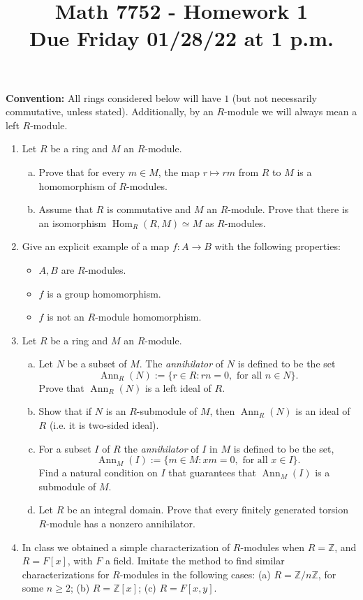 \documentclass[12pt,
psamsfonts]{amsart}
\title{Math 7752 - Homework 1\\
Due Friday 01/28/22 at 1 p.m.}
\theoremstyle{remark}
\theoremstyle{definition}
\newcommand{\Z}{\mathbb{Z}\xspace}
\DeclareMathOperator{\Hom}{Hom}
\DeclareMathOperator{\Ann}{Ann}
\numberwithin{equation}{section}
\begin{document}
\maketitle
\textbf{Convention:} All rings considered below will have $1$ (but not necessarily commutative, unless stated). Additionally, by an $R$-module we will always mean a left $R$-module. 
\begin{enumerate}
\item Let $R$ be a ring and $M$ an $R$-module. 
\begin{enumerate}
[(a)]\item Prove that for every $m\in M$, the map $r\mapsto rm$ from $R$ to $M$ is a homomorphism of $R$-modules. 
\item Assume that $R$ is commutative and $M$ an $R$-module. Prove that there is an isomorphism  $\Hom_R(R,M)\simeq M$ as $R$-modules. 
\end{enumerate}
\item Give an explicit example of a map $f:A\to B$ with the following properties: \begin{itemize}
\item $A,B$ are $R$-modules.
\item $f$ is a group homomorphism.
\item $f$ is not an $R$-module homomorphism. 
\end{itemize}
\item Let $R$ be a ring and $M$ an $R$-module. 
\begin{enumerate}
[(a)]\item Let $N$ be a subset of $M$. The \textit{annihilator} of $N$ is defined to be the set \[\Ann_R(N):=\{r\in R: rn=0, \text{ for all }n\in N\}.\] Prove that $\Ann_R(N)$ is a left ideal of $R$. 
\item Show that if $N$ is an $R$-submodule of $M$, then $\Ann_R(N)$ is an ideal of $R$ (i.e. it is two-sided ideal). 
\item For a subset $I$ of $R$ the \textit{annihilator} of $I$ in $M$ is defined to be the set, 
\[\Ann_M(I):=\{m\in M:xm=0, \text{ for all }x\in I\}.\] Find a natural condition on $I$ that guarantees that $\Ann_M(I)$ is a submodule of $M$. 
\item Let $R$ be an integral domain. Prove that every finitely generated torsion $R$-module has a nonzero annihilator. 
\end{enumerate}
\item In class we obtained a simple characterization of $R$-modules when $R=\Z$, and $R=F[x]$, with $F$ a field. Imitate the method to find similar characterizations for $R$-modules in the following cases: (a) $R=\Z/n\Z$, for some $n\geq 2$; (b) $R=\Z[x]$; (c) $R=F[x,y]$.  

\end{enumerate}
\end{document}
